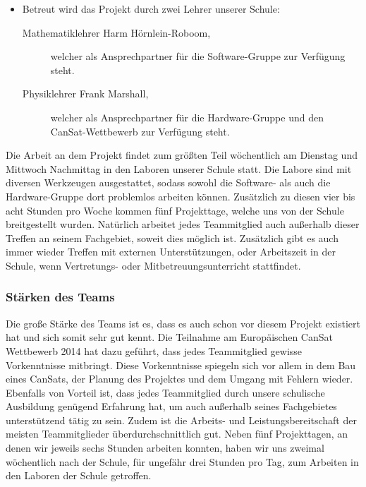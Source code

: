 \begin{itemize}
\item Betreut wird das Projekt durch zwei Lehrer unserer Schule:
\begin{description}
\item [Mathematiklehrer Harm Hörnlein-Roboom,] welcher als Ansprechpartner für die Software-Gruppe zur Verfügung steht.
\item [Physiklehrer Frank Marshall,] welcher als Ansprechpartner für die Hardware-Gruppe und den CanSat-Wettbewerb zur Verfügung steht.
\end{description}

\end{itemize}

Die Arbeit an dem Projekt findet zum größten Teil wöchentlich am Dienstag und Mittwoch Nachmittag in den Laboren unserer Schule statt. Die Labore sind mit diversen Werkzeugen ausgestattet, sodass sowohl die Software- als auch die Hardware-Gruppe dort problemlos arbeiten können. Zusätzlich zu diesen vier bis acht Stunden pro Woche kommen fünf Projekttage, welche uns von der Schule breitgestellt wurden. Natürlich arbeitet jedes Teammitglied auch außerhalb dieser Treffen an seinem Fachgebiet, soweit dies möglich ist. Zusätzlich gibt es auch immer wieder Treffen mit externen Unterstützungen, oder Arbeitszeit in der Schule, wenn Vertretungs- oder Mitbetreuungsunterricht stattfindet.

\subsubsection{Stärken des Teams}
Die große Stärke des Teams ist es, dass es auch schon vor diesem Projekt existiert hat und sich somit sehr gut kennt. Die Teilnahme am Europäischen CanSat Wettbewerb 2014 hat dazu geführt, dass jedes Teammitglied gewisse Vorkenntnisse mitbringt. Diese Vorkenntnisse spiegeln sich vor allem in dem Bau eines CanSats, der Planung des Projektes und dem Umgang mit Fehlern wieder. Ebenfalls von Vorteil ist, dass jedes Teammitglied durch unsere schulische Ausbildung genügend Erfahrung hat, um auch außerhalb seines Fachgebietes unterstützend tätig zu sein. Zudem ist die Arbeits- und Leistungsbereitschaft der meisten Teammitglieder überdurchschnittlich gut. Neben fünf Projekttagen, an denen wir jeweils sechs Stunden arbeiten konnten, haben wir uns zweimal wöchentlich nach der Schule, für ungefähr drei Stunden pro Tag, zum Arbeiten in den Laboren der Schule getroffen.

